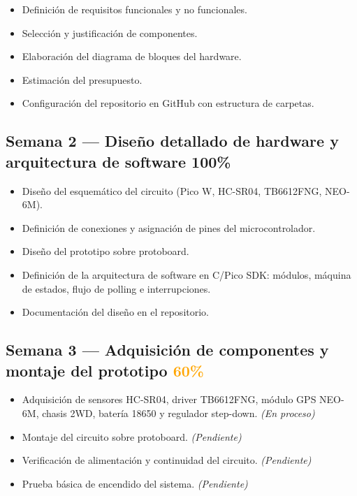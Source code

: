 \documentclass[12pt]{report}
\begin{document}
\begin{itemize}
    \item Definición de requisitos funcionales y no funcionales.
    \item Selección y justificación de componentes.
    \item Elaboración del diagrama de bloques del hardware.
    \item Estimación del presupuesto.
    \item Configuración del repositorio en GitHub con estructura de carpetas.
\end{itemize}

\subsection*{Semana 2 — Diseño detallado de hardware y arquitectura de software \hfill \textcolor{green!60!black}{100\%}}

\begin{itemize}
    \item Diseño del esquemático del circuito (Pico W, HC-SR04, TB6612FNG, NEO-6M).
    \item Definición de conexiones y asignación de pines del microcontrolador.
    \item Diseño del prototipo sobre protoboard.
    \item Definición de la arquitectura de software en C/Pico SDK: módulos, máquina de estados, flujo de polling e interrupciones.
    \item Documentación del diseño en el repositorio.
\end{itemize}

\subsection*{Semana 3 — Adquisición de componentes y montaje del prototipo \hfill \textcolor{orange}{60\%}}

\begin{itemize}
    \item Adquisición de sensores HC-SR04, driver TB6612FNG, módulo GPS NEO-6M, chasis 2WD, batería 18650 y regulador step-down. \textit{(En proceso)}
    \item Montaje del circuito sobre protoboard. \textit{(Pendiente)}
    \item Verificación de alimentación y continuidad del circuito. \textit{(Pendiente)}
    \item Prueba básica de encendido del sistema. \textit{(Pendiente)}
\end{itemize}
\end{document}
